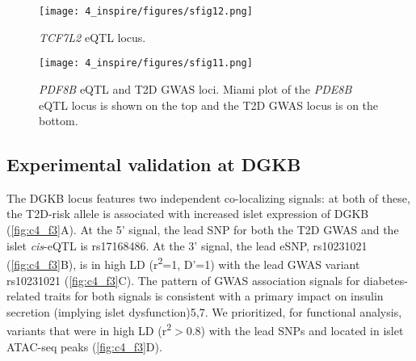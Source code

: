 \begin{figure}
    \centering
    \texttt{[image: 4\_inspire/figures/sfig12.png]}
    \caption[\textit{TCF7L2} eQTL locus]{\textit{TCF7L2} eQTL locus.}
    \label{fig:c4_sf12}
\end{figure}

\begin{figure}
    \centering
    \texttt{[image: 4\_inspire/figures/sfig11.png]}
    \caption[\textit{PDF8B} eQTL and T2D GWAS loci]{\textit{PDF8B} eQTL and T2D GWAS loci. Miami plot of the \textit{PDE8B} eQTL locus is shown on the top and the T2D GWAS locus is on the bottom.}
    \label{fig:c4_sf11}
\end{figure}


\subsection{Experimental validation at DGKB}
The DGKB locus features two independent co-localizing signals: at both of these, the T2D-risk allele is associated with increased islet expression of DGKB (\ref{fig:c4_f3}A). At the 5' signal, the lead SNP for both the T2D GWAS and the islet \textit{cis}-eQTL is rs17168486. At the 3' signal, the lead eSNP, rs10231021 (\ref{fig:c4_f3}B), is in high LD (r\textsuperscript{2}=1, D'=1) with the lead GWAS variant rs10231021 (\ref{fig:c4_f3}C). The pattern of GWAS association signals for diabetes-related traits for both signals is consistent with a primary impact on insulin secretion (implying islet dysfunction)5,7.  We prioritized, for functional analysis, variants that were in high LD (r\textsuperscript{2}$>$0.8) with the lead SNPs and located in islet ATAC-seq peaks (\ref{fig:c4_f3}D). \\

